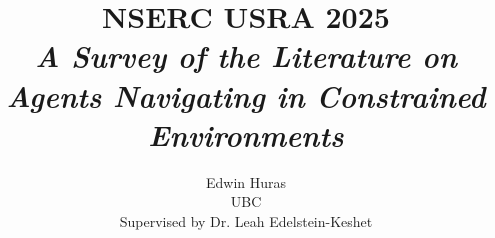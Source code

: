 \documentclass [11pt]{article}
\title{NSERC USRA 2025 \\\medskip \textit{A Survey of the Literature on Agents Navigating in Constrained Environments}}
\author{Edwin Huras\\UBC\\Supervised by Dr. Leah Edelstein-Keshet}
\date{}
\begin{document}
\maketitle
\nocite{*}


\end{document}
